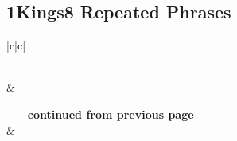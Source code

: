 \subsection{1Kings8 Repeated Phrases}


\normalsize
 
\begin{center}
\begin{longtable}{|c|c|}
\caption[1Kings8 Repeated Phrases]{1Kings8 Repeated Phrases}\label{table:Repeated Phrases 1Kings8} \\
\hline {} &  \\ \hline 
\endfirsthead
 
{{\bfseries \tablename\ \thetable{} -- continued from previous page}} \\  
\hline {} &  \\ \hline 
\endhead
 

\end{longtable}
\end{center}
